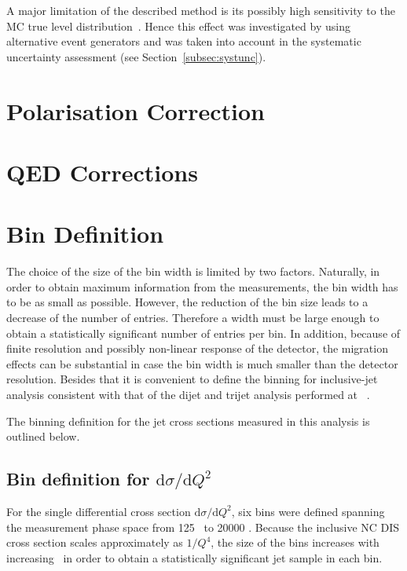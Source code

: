 A major limitation of the described method is its possibly high sensitivity to the MC true level distribution~\cite{Cowan:2002in}. Hence this effect was investigated by using alternative event generators and was taken into account in the systematic uncertainty assessment (see Section~\ref{subsec:systunc}).

\section{Polarisation Correction}

 
\section{QED Corrections}
\label{sec:qedcor}


\section{Bin Definition}
\label{sec:bindef}
The choice of the size of the bin width is limited by two factors. Naturally, in order to obtain maximum information from the measurements, the bin width has to be as small as possible. However, the reduction of the bin size leads to a decrease of the number of entries. Therefore a width must be large enough to obtain a statistically significant number of entries per bin. In addition, because of finite resolution and possibly non-linear response of the detector, the migration effects can be substantial in case the bin width is much smaller than the detector resolution. Besides that it is convenient to define the binning for inclusive-jet analysis consistent with that of the dijet and trijet analysis performed at \zeus~\cite{thesis:behr:2010,thesis:makarenko:2015}.

The binning definition for the jet cross sections measured in this analysis is outlined below.
\subsection*{Bin definition for ${\mathrm{d}\sigma}/{\mathrm{d}Q^2}$}
\label{subsec:bindefq2}
For the single differential cross section ${\mathrm{d}\sigma}/{\mathrm{d}Q^2}$, six bins were defined spanning the measurement phase space from 125 \GeV~to 20000 \GeV. Because the inclusive NC DIS cross section scales approximately as $1/Q^4$, the size of the bins increases with increasing \qsq~in order to obtain a statistically significant jet sample in each bin.
